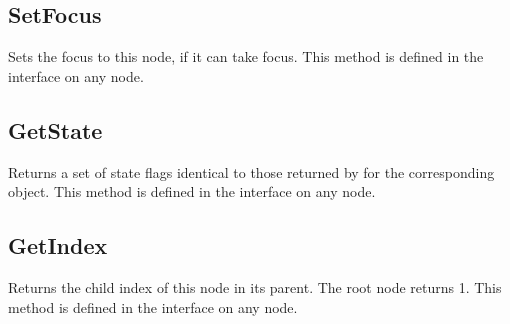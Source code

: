 \documentclass[letterpaper,12pt,english,openany,oneside]{sphinxmanual}
\begin{document}
\begin{sphinxVerbatim}[commandchars=\\\{\}]
 
 
 
\end{sphinxVerbatim}


\subsection{SetFocus}
\label{\detokenize{Access_DOM:setfocus}}
Sets the focus to this node, if it can take focus. This method is defined in the  interface on any node.

\begin{sphinxVerbatim}[commandchars=\\\{\}]
 
\end{sphinxVerbatim}


\subsection{GetState}
\label{\detokenize{Access_DOM:getstate}}
Returns a set of state flags identical to those returned by  for the corresponding  object. This method is defined in the  interface on any node.

\begin{sphinxVerbatim}[commandchars=\\\{\}]
 
 
\end{sphinxVerbatim}


\subsection{GetIndex}
\label{\detokenize{Access_DOM:getindex}}
Returns the child index of this node in its parent. The root node returns \sphinxhyphen{}1. This method is defined in the  interface on any node.

\begin{sphinxVerbatim}[commandchars=\\\{\}]
 
 
\end{sphinxVerbatim}
\end{document}
